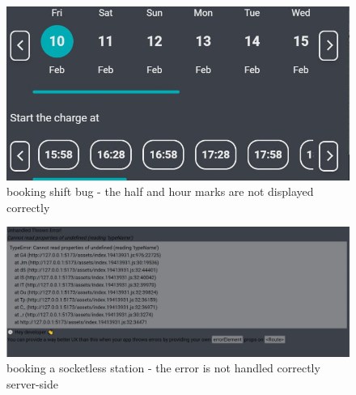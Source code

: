 \documentclass[table, 12pt]{article}
\begin{document}
\begin{figure}[H]
   \centering
    \includegraphics[scale=0.44, center]{assets/booking_shifted_time.jpg}
    \caption{booking shift bug - the half and hour marks are not displayed correctly}
    \label{fig: Booking_shift}
\end{figure}
\begin{figure}[H]
   \centering
    \includegraphics[scale=0.33, center]{assets/unhandled_booking_error.jpg}
    \caption{booking a socketless station - the error is not handled correctly server-side}
    \label{fig: Booking_socketless}
\end{figure}
\end{document}
